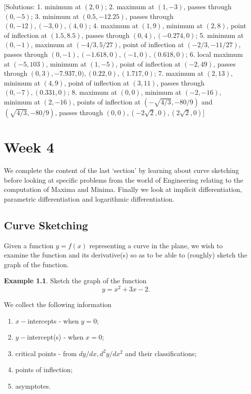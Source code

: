 \documentclass[
  11pt,
  oneside]{book}
\providecommand{\tightlist}{%
  \setlength{\itemsep}{0pt}\setlength{\parskip}{0pt}}
\newcommand{\slide}{}
\theoremstyle{definition}
\theoremstyle{definition}
\newtheorem{example}{Example}[chapter]
\theoremstyle{definition}
\theoremstyle{definition}
\theoremstyle{remark}
\begin{document}
{[}Solutions: 1. minimum at \((2,0)\); 2. maximum at \((1,-3)\), passes through \((0,-5)\); 3. minimum at \((0.5,-12.25)\), passes through \((0,-12), (-3,0), (4,0)\); 4. maximum at \((1,9)\), minimum at \((2,8)\), point of inflection at \((1.5,8.5)\), passes through \((0,4), (-0.274,0)\); 5. minimum at \((0,-1)\), maximum at \((-4/3,5/27)\), point of inflection at \((-2/3,-11/27)\), passes through \((0,-1), (-1.618,0), (-1,0), (0.618,0)\); 6. local maximum at \((-5,103)\), minimum at \((1,-5)\), point of inflection at \((-2,49)\), passes through \((0,3), -7.937,0), (0.22,0), (1.717,0)\); 7. maximum at \((2,13)\), minimum at \((4,9)\), point of inflection at \((3,11)\), passes through \((0,-7), (0.331,0)\); 8. maximum at \((0,0)\), minimum at \((-2,-16)\), minimum at \((2,-16)\), points of inflection at \((-\sqrt{4/3},-80/9)\) and \((\sqrt{4/3},-80/9)\), passes through \((0,0), (-2\sqrt{2},0), (2\sqrt{2},0)\){]}

\chapter{Week 4}\label{week-four}

We complete the content of the last `section' by learning about curve sketching before looking at specific problems from the world of Engineering relating to the computation of Maxima and Minima. Finally we look at implicit differentiation, parametric differentiation and logarithmic differentiation.

\slide

\section{Curve Sketching}\label{curve-sketching}

Given a function \(y=f(x)\) representing a curve in the plane, we wish to examine the function and its derivative(s) so as to be able to (roughly) sketch the graph of the function.

\begin{example}
Sketch the graph of the function
\[
y = x^2+3x-2.
\]
\end{example}

We collect the following information

\begin{enumerate}
\def\labelenumi{\arabic{enumi}.}
\tightlist
\item
  \(x-\)intercepts - when \(y=0\);
\item
  \(y-\)intercept(s) - when \(x = 0\);
\item
  critical points - from \(dy/dx, d^2y/dx^2\) and their classifications;
\item
  points of inflection;
\item
  asymptotes.
\end{enumerate}
\end{document}
